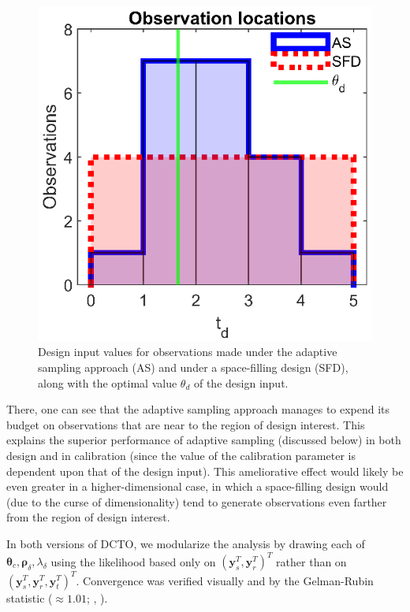 \documentclass[twocolumn,10pt]{asme2ej}
\begin{document}
%
\begin{figure}
	\centering
	\includegraphics[scale=0.85]{FIG_AS_vs_SFD_obs_locs}
	\captionsetup{width=.85\linewidth}
	\caption{Design input values for observations made under the adaptive sampling approach (AS) and under a space-filling design (SFD), along with the optimal value $\theta_d$ of the design input.}
	\label{fig:AS_distribution}
\end{figure}
%
There, one can see that the adaptive sampling approach manages to expend its budget on observations that are near to the region of design interest.
%
This explains the superior performance of adaptive sampling (discussed below) in both design and in calibration (since the value of the calibration parameter is dependent upon that of the design input).
%
This ameliorative effect would likely be even greater in a higher-dimensional case, in which a space-filling design would (due to the curse of dimensionality) tend to generate observations even farther from the region of design interest.
%

%
In both versions of DCTO, we modularize the analysis by drawing each of $\boldsymbol\theta_c,\boldsymbol\rho_\delta,\lambda_\delta$ using the likelihood based only on $(\mathbf y_s^T,\mathbf y_r^T)^T$ rather than on $(\mathbf y_s^T,\mathbf y_r^T,\mathbf y_t^T)^T$.
%
Convergence was verified visually and by the Gelman-Rubin statistic ($\approx 1.01$; \cite{Gelman1992a}, \cite{Gelman1992a}).
%
\end{document}
